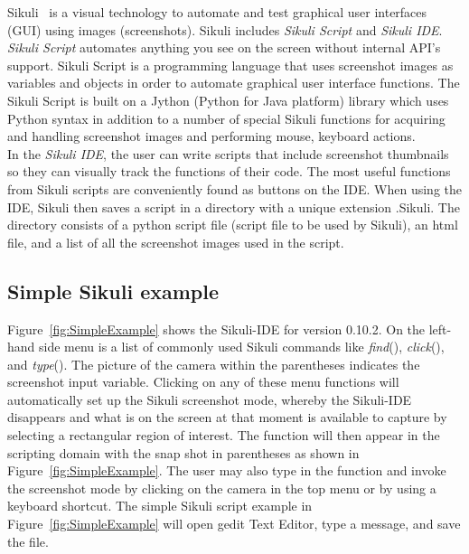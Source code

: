 \documentclass{InsightArticle}
\begin{document}
Sikuli~\cite{Sikuli:Documentation,Sikuli:Website,Yeh:2009:Sikuli} is a visual
technology to automate and test graphical user interfaces (GUI) using images
(screenshots). Sikuli includes \emph{Sikuli Script} and \emph{Sikuli IDE}.\\

\emph{Sikuli Script} automates anything you see on the screen without internal
API's support. Sikuli Script is a programming language that uses screenshot
images as variables and objects in order to automate graphical user interface
functions. The Sikuli Script is built on a Jython (Python for Java platform)
library which uses Python syntax in addition to a number of special Sikuli
functions for acquiring and handling screenshot images and performing mouse,
keyboard actions.\\

In the \emph{Sikuli IDE}, the user can write scripts that include screenshot
thumbnails so they can visually track the functions of their code. The most
useful functions from Sikuli scripts are conveniently found as
buttons on the IDE. When using the IDE, Sikuli then saves a script in a
directory with a unique extension .Sikuli. The directory consists of a python
script file (script file to be used by Sikuli), an html file, and a list of all
the screenshot images used in the script.

\subsection{Simple Sikuli example} %
\label{sec:SimpleSikuliExample}

Figure~\ref{fig:SimpleExample} shows the Sikuli-IDE for version 0.10.2. On the
left-hand side menu is a list of commonly used Sikuli commands
like \emph{find}(), \emph{click}(), and \emph{type}(). The picture of
the camera within the parentheses indicates the screenshot input variable.
Clicking on any of these menu functions will automatically set up the Sikuli
screenshot mode, whereby the Sikuli-IDE disappears and what is on the screen at
that moment is available to capture by selecting a rectangular region of
interest. The function will then appear in the scripting domain with the snap
shot in parentheses as shown in Figure~\ref{fig:SimpleExample}. The user may
also type in the function and invoke the screenshot mode by clicking on the
camera in the top menu or by using a keyboard shortcut. The simple Sikuli script
example in Figure~\ref{fig:SimpleExample} will open gedit Text Editor, type a
message, and save the file.
\end{document}
